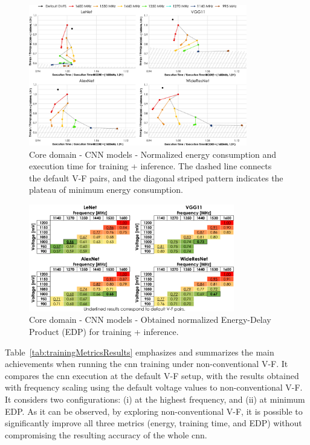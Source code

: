 \begin{figure}[!htb]
    \centering
        \includegraphics[width=0.85\textwidth]{Figures/Application To Deep Learning/CNN_behaviour.pdf}
        \caption{Core domain - CNN models - Normalized energy consumption and execution time for training + inference. The dashed line connects the default V-F pairs, and the diagonal striped pattern indicates the plateau of minimum energy consumption.}
    \label{fig:CNN_Behaviour_training_inf}
\end{figure}

\begin{figure}[!htb]
    \centering
        \includegraphics[width=0.8\textwidth]{Figures/Application To Deep Learning/CNN_EDP.pdf}
        \caption{Core domain - CNN models - Obtained normalized Energy-Delay Product (EDP) for training + inference.}
    \label{fig:CNN_EDP_training_inf}
\end{figure}

Table~\ref{tab:trainingMetricsResults} emphasizes and summarizes the main achievements when running the \acrshort{cnn} training under non-conventional V-F. It compares the \acrshort{cnn} execution at the default V-F setup, with the results obtained with frequency scaling using the default voltage values to non-conventional V-F. It considers two configurations: (i) at the highest frequency, and (ii) at minimum EDP. As it can be observed, by exploring non-conventional V-F, it is possible to significantly improve all three metrics (energy, training time, and EDP) without compromising the resulting accuracy of the whole \acrshort{cnn}. 

